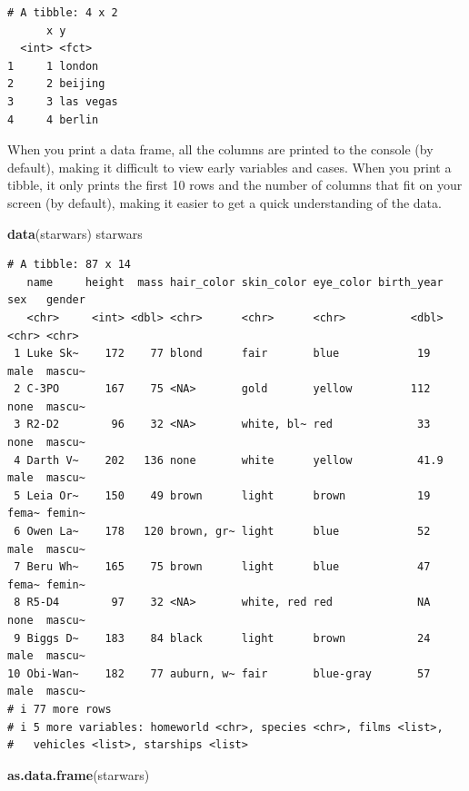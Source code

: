 \documentclass[
]{article}
\newenvironment{Shaded}{\begin{snugshade}}{\end{snugshade}}
\newcommand{\FunctionTok}[1]{\textcolor[rgb]{0.13,0.29,0.53}{\textbf{#1}}}
\newcommand{\NormalTok}[1]{#1}
\begin{document}
\begin{verbatim}
# A tibble: 4 x 2
      x y        
  <int> <fct>    
1     1 london   
2     2 beijing  
3     3 las vegas
4     4 berlin   
\end{verbatim}

When you print a data frame, all the columns are printed to the console
(by default), making it difficult to view early variables and cases.
When you print a tibble, it only prints the first 10 rows and the number
of columns that fit on your screen (by default), making it easier to get
a quick understanding of the data.

\begin{Shaded}
\begin{Highlighting}[]
\FunctionTok{data}\NormalTok{(starwars)}
\NormalTok{starwars}
\end{Highlighting}
\end{Shaded}

\begin{verbatim}
# A tibble: 87 x 14
   name     height  mass hair_color skin_color eye_color birth_year sex   gender
   <chr>     <int> <dbl> <chr>      <chr>      <chr>          <dbl> <chr> <chr> 
 1 Luke Sk~    172    77 blond      fair       blue            19   male  mascu~
 2 C-3PO       167    75 <NA>       gold       yellow         112   none  mascu~
 3 R2-D2        96    32 <NA>       white, bl~ red             33   none  mascu~
 4 Darth V~    202   136 none       white      yellow          41.9 male  mascu~
 5 Leia Or~    150    49 brown      light      brown           19   fema~ femin~
 6 Owen La~    178   120 brown, gr~ light      blue            52   male  mascu~
 7 Beru Wh~    165    75 brown      light      blue            47   fema~ femin~
 8 R5-D4        97    32 <NA>       white, red red             NA   none  mascu~
 9 Biggs D~    183    84 black      light      brown           24   male  mascu~
10 Obi-Wan~    182    77 auburn, w~ fair       blue-gray       57   male  mascu~
# i 77 more rows
# i 5 more variables: homeworld <chr>, species <chr>, films <list>,
#   vehicles <list>, starships <list>
\end{verbatim}

\begin{Shaded}
\begin{Highlighting}[]
\FunctionTok{as.data.frame}\NormalTok{(starwars)}
\end{Highlighting}
\end{Shaded}
\end{document}
